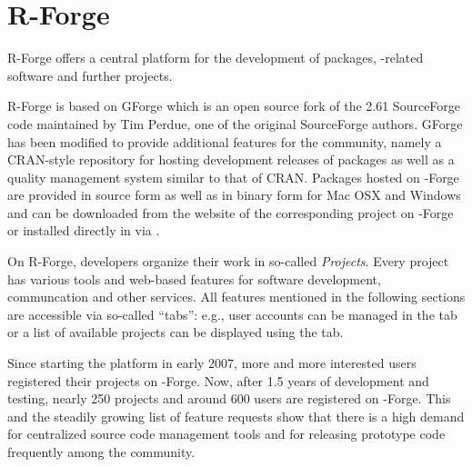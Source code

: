 \section{R-Forge}
R-Forge offers a central platform for the development of \R{}
packages, \R{}-related software and further projects. 

R-Forge is based on GForge \citep{forge:copeland_et_al:2006} which is
an open source fork of the 2.61 SourceForge code maintained by Tim
Perdue, one of the original SourceForge authors. GForge has been
modified to provide additional features for the \R{} community, namely
a CRAN-style repository for hosting development releases of \R{}
packages as well as a quality management system similar to that of
CRAN.
Packages hosted on \R{}-Forge are provided in source form as well as
in binary form for Mac OSX and Windows and can be downloaded from the
website of the corresponding project on \R{}-Forge or installed
directly in \R{} via .






On R-Forge, developers organize their work
in so-called \textit{Projects}. Every project has various tools and
web-based features for software development, communcation and other
services. All features mentioned in the 
following sections are accessible via so-called 
``tabs'': e.g., user accounts can be managed in the  tab or
a list of available projects can be displayed using the
 tab.

Since starting the platform in early 2007, more
and more interested users registered their projects on
\R{}-Forge. Now, after 1.5 years of development and testing, nearly
250 projects and around 600 
users are registered on \R{}-Forge. This and the steadily growing list of
feature requests show that there is a high demand for centralized source code
management tools and for releasing prototype code frequently among the
\R{} community.

